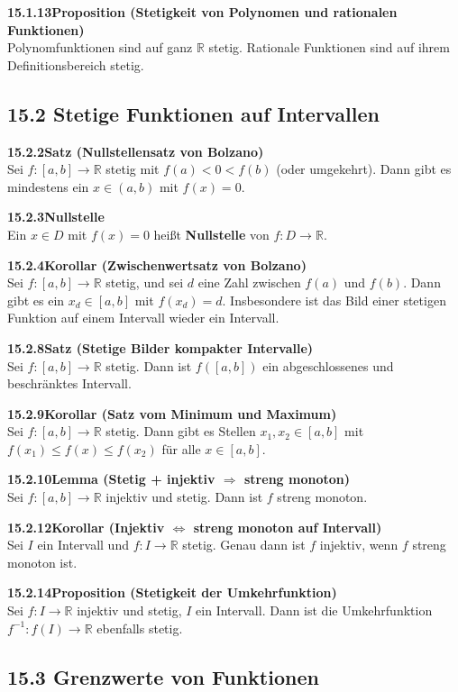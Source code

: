\documentclass[a4paper,12pt]{article}
\newcommand{\gentry}[3]{%
  \noindent\textbf{#1\quad #2}\nopagebreak\\[0.2em]
  #3\par\smallskip
}
\begin{document}
\gentry{15.1.13}{Proposition (Stetigkeit von Polynomen und rationalen Funktionen)}{%
  Polynomfunktionen sind auf ganz $\mathbb{R}$ stetig. Rationale Funktionen sind
  auf ihrem Definitionsbereich stetig.
}

\subsection*{15.2 \quad Stetige Funktionen auf Intervallen}

\gentry{15.2.2}{Satz (Nullstellensatz von Bolzano)}{%
  Sei $f: [a,b] \to \mathbb{R}$ stetig mit $f(a) < 0 < f(b)$ (oder umgekehrt).
  Dann gibt es mindestens ein $x \in (a,b)$ mit $f(x) = 0$.
}

\gentry{15.2.3}{Nullstelle}{%
  Ein $x \in D$ mit $f(x) = 0$ heißt \textbf{Nullstelle} von $f: D \to \mathbb{R}$.
}

\gentry{15.2.4}{Korollar (Zwischenwertsatz von Bolzano)}{%
  Sei $f: [a,b] \to \mathbb{R}$ stetig, und sei $d$ eine Zahl zwischen $f(a)$ und $f(b)$.
  Dann gibt es ein $x_d \in [a,b]$ mit $f(x_d) = d$.
  Insbesondere ist das Bild einer stetigen Funktion auf einem Intervall wieder
  ein Intervall.
}

\gentry{15.2.8}{Satz (Stetige Bilder kompakter Intervalle)}{%
  Sei $f: [a,b] \to \mathbb{R}$ stetig. Dann ist $f([a,b])$ ein abgeschlossenes
  und beschränktes Intervall.
}

\gentry{15.2.9}{Korollar (Satz vom Minimum und Maximum)}{%
  Sei $f: [a,b] \to \mathbb{R}$ stetig. Dann gibt es Stellen $x_1, x_2 \in [a,b]$
  mit $f(x_1) \le f(x) \le f(x_2)$ für alle $x \in [a,b]$.
}

\gentry{15.2.10}{Lemma (Stetig + injektiv $\Rightarrow$ streng monoton)}{%
  Sei $f: [a,b] \to \mathbb{R}$ injektiv und stetig. Dann ist $f$ streng monoton.
}

\gentry{15.2.12}{Korollar (Injektiv $\Leftrightarrow$ streng monoton auf Intervall)}{%
  Sei $I$ ein Intervall und $f: I \to \mathbb{R}$ stetig. Genau dann ist $f$
  injektiv, wenn $f$ streng monoton ist.
}

\gentry{15.2.14}{Proposition (Stetigkeit der Umkehrfunktion)}{%
  Sei $f: I \to \mathbb{R}$ injektiv und stetig, $I$ ein Intervall. Dann ist
  die Umkehrfunktion $f^{-1}: f(I) \to \mathbb{R}$ ebenfalls stetig.
}

\subsection*{15.3 \quad Grenzwerte von Funktionen}
\end{document}
